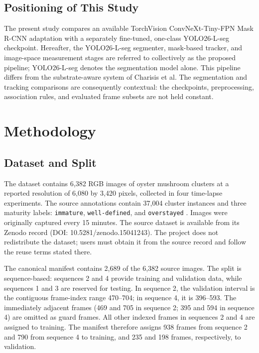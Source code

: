 \documentclass[11pt,a4paper]{article}
\begin{document}
\subsection{Positioning of This Study}

The present study compares an available TorchVision ConvNeXt-Tiny-FPN Mask R-CNN adaptation with a separately fine-tuned, one-class YOLO26-L-seg checkpoint. Hereafter, the YOLO26-L-seg segmenter, mask-based tracker, and image-space measurement stages are referred to collectively as the proposed pipeline; YOLO26-L-seg denotes the segmentation model alone. This pipeline differs from the substrate-aware system of Charisis et al. The segmentation and tracking comparisons are consequently contextual: the checkpoints, preprocessing, association rules, and evaluated frame subsets are not held constant.

\section{Methodology}

\subsection{Dataset and Split}

The dataset contains 6,382 RGB images of oyster mushroom clusters at a reported resolution of 6,080 by 3,420 pixels, collected in four time-lapse experiments. The source annotations contain 37,004 cluster instances and three maturity labels: \texttt{immature}, \texttt{well-defined}, and \texttt{overstayed} \cite{dataset,charisis}. Images were originally captured every 15 minutes. The source dataset is available from its Zenodo record (DOI: 10.5281/zenodo.15041243). The project does not redistribute the dataset; users must obtain it from the source record and follow the reuse terms stated there.

The canonical manifest contains 2,689 of the 6,382 source images. The split is sequence-based: sequences 2 and 4 provide training and validation data, while sequences 1 and 3 are reserved for testing. In sequence 2, the validation interval is the contiguous frame-index range 470--704; in sequence 4, it is 396--593. The immediately adjacent frames (469 and 705 in sequence 2; 395 and 594 in sequence 4) are omitted as guard frames. All other indexed frames in sequences 2 and 4 are assigned to training. The manifest therefore assigns 938 frames from sequence 2 and 790 from sequence 4 to training, and 235 and 198 frames, respectively, to validation.
\end{document}
